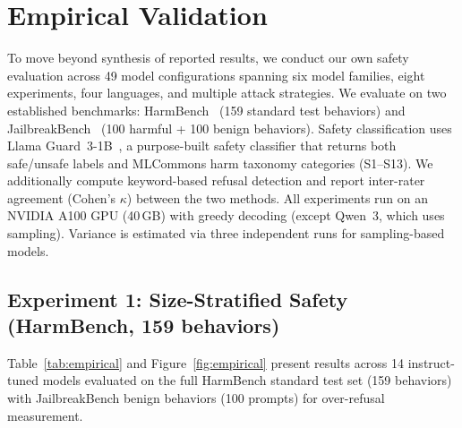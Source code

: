 \documentclass[12pt,a4paper]{article}
\begin{document}
\section{Empirical Validation}\label{sec:empirical}

To move beyond synthesis of reported results, we conduct our own safety evaluation across 49 model configurations spanning six model families, eight experiments, four languages, and multiple attack strategies. We evaluate on two established benchmarks: HarmBench~\citep{mazeika2024harmbench} (159 standard test behaviors) and JailbreakBench~\citep{chao2024jailbreakbench} (100 harmful + 100 benign behaviors). Safety classification uses Llama Guard~3-1B~\citep{inan2023llamaguard}, a purpose-built safety classifier that returns both safe/unsafe labels and MLCommons harm taxonomy categories (S1--S13). We additionally compute keyword-based refusal detection and report inter-rater agreement (Cohen's $\kappa$) between the two methods. All experiments run on an NVIDIA A100 GPU (40\,GB) with greedy decoding (except Qwen~3, which uses sampling). Variance is estimated via three independent runs for sampling-based models.

\subsection{Experiment 1: Size-Stratified Safety (HarmBench, 159 behaviors)}\label{sec:exp1}

Table~\ref{tab:empirical} and Figure~\ref{fig:empirical} present results across 14 instruct-tuned models evaluated on the full HarmBench standard test set (159 behaviors) with JailbreakBench benign behaviors (100 prompts) for over-refusal measurement.
\end{document}
